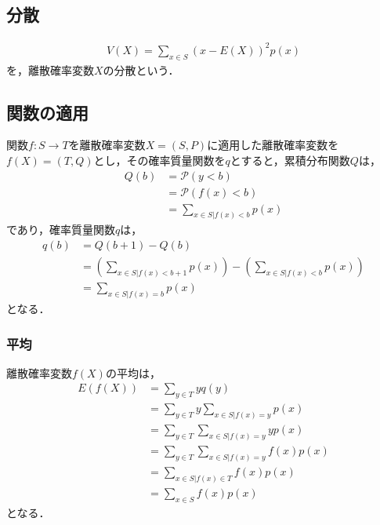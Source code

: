 \documentclass[dvipdfmx]{jsarticle}
\begin{document}
 \subsection{分散}
 \begin{align}
  V\left(X\right)=\sum_{x\in S}\left(x-E\left(X\right)\right)^2p\left(x\right)
 \end{align}
を，離散確率変数$X$の分散という．
 \subsection{関数の適用}
関数$f:S\to T$を離散確率変数$X=\left(S,P\right)$に適用した離散確率変数を$f\left(X\right)=\left(T,Q\right)$とし，その確率質量関数を$q$とすると，累積分布関数$Q$は，
 \begin{align}
  Q\left(b\right)&=\mathscr{P}\left(y<b\right)\nonumber\\
  &=\mathscr{P}\left(f\left(x\right)<b\right)\nonumber\\
  &=\sum_{x\in S|f\left(x\right)<b}p\left(x\right)
 \end{align}
であり，確率質量関数$q$は，
 \begin{align}
  q\left(b\right)&=Q\left(b+1\right)-Q\left(b\right)\nonumber\\
  &=\left(\sum_{x\in S|f\left(x\right)<b+1}p\left(x\right)\right)-\left(\sum_{x\in S|f\left(x\right)<b}p\left(x\right)\right)\nonumber\\
  &=\sum_{x\in S|f\left(x\right)=b}p\left(x\right)
 \end{align}
となる．
 \subsubsection{平均}
離散確率変数$f\left(X\right)$の平均は，
 \begin{align}
  E\left(f\left(X\right)\right)&=\sum_{y\in T}yq\left(y\right)\nonumber\\
  &=\sum_{y\in T}y\sum_{x\in S|f\left(x\right)=y}p\left(x\right)\nonumber\\
  &=\sum_{y\in T}\sum_{x\in S|f\left(x\right)=y}yp\left(x\right)\nonumber\\
  &=\sum_{y\in T}\sum_{x\in S|f\left(x\right)=y}f\left(x\right)p\left(x\right)\nonumber\\
  &=\sum_{x\in S|f\left(x\right)\in T}f\left(x\right)p\left(x\right)\nonumber\\
  &=\sum_{x\in S}f\left(x\right)p\left(x\right)
 \end{align}
となる．
\end{document}
